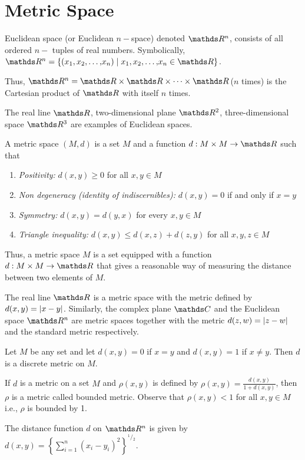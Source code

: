\documentclass[../main-sheet.tex]{subfiles}
\begin{document}
\section{Metric Space}
\begin{defn}
    Euclidean space (or Euclidean $ n- $space) denoted $ \R^n $, consists of all ordered $ n- $ tuples of real numbers. Symbolically, $ \R^n=\set{\left( \xn{x}{,} \right)\mid \xn{x}{,}\in \R} $.

    Thus, $ \R^n=\R\times \R\times\dots\times\R $($ n $ times) is the Cartesian product of $ \R $ with itself $ n $ times.
\end{defn}
\begin{ex}
    The real line $ \R $, two-dimensional plane $ \R^2 $, three-dimensional space $ \R^3 $ are examples of Euclidean spaces.
\end{ex}
\begin{defn}
    A metric space $ (M,d) $ is a set $ M $ and a function $ d:M\times M\to \R $ such that
    \begin{enumerate}[label=(\roman*)]
        \item \emph{Positivity:} $ d(x,y)\geq 0 $ for all $ x,y\in M$   
        \item \emph{Non degeneracy (identity of indiscernibles):} $ d(x,y)=0 $ if and only if $ x=y$
        \item \emph{Symmetry:} $ d(x,y)=d(y,x) $ for every $ x,y \in M $
        \item \emph{Triangle inequality:} $ d(x,y)\leq d(x,z)+d(z,y) $ for all $ x,y,z \in M$
    \end{enumerate}
    Thus, a metric space $ M $ is a set equipped with a function $ d:M\times M \to\R $ that gives a reasonable way of measuring the distance between two elements of $ M $.
\end{defn}
\begin{ex}
    The real line $ \R $ is a metric space with the metric defined by $ d(x,y)=\left\vert x-y\right\vert $. Similarly, the complex plane $ \C $ and the Euclidean space $ \R^n $ are metric spaces together with the metric $ d(z,w)=\left\vert z-w\right\vert $ and the standard metric respectively.
\end{ex}
\begin{defn}
    Let $ M $ be any set and let $ d(x,y)=0 $ if $ x=y $ and $ d(x,y)=1 $ if $ x\neq y $. Then $ d $ is a discrete metric on $ M $.
\end{defn}
\begin{defn}
    If $ d $ is a metric on a set $ M $ and $ \rho(x,y) $ is defined by $ \rho(x,y)=\frac{d(x,y)}{1+d(x,y)} $, then $ \rho $ is a metric called bounded metric. Observe that $ \rho(x,y)<1 $ for all $ x,y\in M $ i.e., $ \rho  $ is bounded by 1.
\end{defn}
\begin{note}
    The distance function $ d $ on $ \R^n $ is given by $ d(x,y)=\left\{ \sum_{i=1}^n (x_i-y_i)^2 \right\}^{{}^1/{}_2} $.
\end{note}
\end{document}
